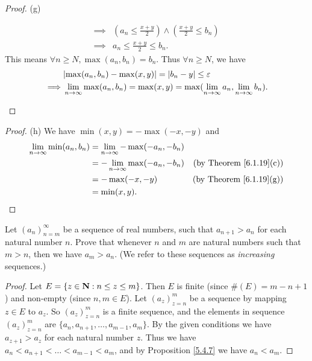 \begin{proof}{(g)}
\begin{itemize}
\begin{align*}
                  \implies & (a_n \leq \frac{x + y}{2}) \land (\frac{x + y}{2} \leq b_n)                                                     \\
                  \implies & a_n \leq \frac{x + y}{2} \leq b_n.
              \end{align*}
              This means \(\forall n \geq N, \max(a_n, b_n) = b_n\).
              Thus \(\forall n \geq N\), we have
              \begin{align*}
                           & \abs{\max(a_n, b_n) - \max(x, y)} = \abs{b_n - y} \leq \varepsilon                                        \\
                  \implies & \lim_{n \to \infty} \max(a_n, b_n) = \max(x, y) = \max(\lim_{n \to \infty} a_n, \lim_{n \to \infty} b_n).
              \end{align*}
    \end{itemize}
\end{proof}

\begin{proof}{(h)}
    We have \(\min(x, y) = -\max(-x, -y)\) and
    \begin{align*}
        \lim_{n \to \infty} \min(a_n, b_n) & = \lim_{n \to \infty} -\max(-a_n, -b_n)                                       \\
                                           & = -\lim_{n \to \infty} \max(-a_n, -b_n) & \text{(by Theorem \ref{6.1.19}(c))} \\
                                           & = -\max(-x, -y)                         & \text{(by Theorem \ref{6.1.19}(g))} \\
                                           & = \min(x, y).
    \end{align*}
\end{proof}

\exercisesection

\begin{exercise}\label{ex 6.1.1}
    Let \((a_n)_{n = m}^\infty\) be a sequence of real numbers, such that \(a_{n + 1} > a_n\) for each natural number \(n\).
    Prove that whenever \(n\) and \(m\) are natural numbers such that \(m > n\), then we have \(a_m > a_n\).
    (We refer to these sequences as \emph{increasing} sequences.)
\end{exercise}

\begin{proof}
    Let \(E = \{z \in \mathbf{N} : n \leq z \leq m\}\).
    Then \(E\) is finite (since \(\#(E) = m - n + 1\)) and non-empty (since \(n, m \in E\)).
    Let \((a_z)_{z = n}^m\) be a sequence by mapping \(z \in E\) to \(a_z\).
    So \((a_z)_{z = n}^m\) is a finite sequence, and the elements in sequence \((a_z)_{z = n}^m\) are \(\{a_n, a_{n + 1}, \dots, a_{m - 1}, a_m\}\).
    By the given conditions we have \(a_{z + 1} > a_z\) for each natural number \(z\).
    Thus we have \(a_n < a_{n + 1} < \dots < a_{m - 1} < a_m\), and by Proposition \ref{5.4.7} we have \(a_n < a_m\).
\end{proof}

